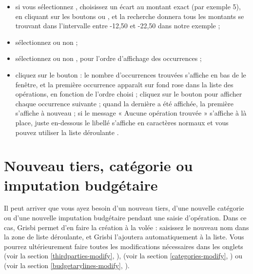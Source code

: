 \begin{enumerate}
\begin{itemize}
		\item si vous sélectionnez , choisissez un écart au montant exact (par exemple 5), en cliquant sur les boutons \menu{+} ou \menu{-}, et la recherche donnera tous les montants se trouvant dans l’intervalle entre -12,50 et -22,50 dans notre exemple ;
		\item sélectionnez ou non  ;
		\item sélectionnez ou non , pour l'ordre d'affichage des occurrences ; 
		\item cliquez sur le bouton  : le nombre d'occurrences trouvées s'affiche en bas de le fenêtre, et la première occurrence apparaît sur fond rose{\couleur} dans la liste des opérations, en fonction de l'ordre choisi ; cliquez sur le bouton  pour afficher chaque occurrence suivante ; quand la dernière a été affichée, la première s'affiche à nouveau ;	si le message « Aucune opération trouvée » s'affiche à là place, juste en-dessous le libellé  s'affiche en caractères normaux et vous pouvez utiliser la liste déroulante .	
	\end{itemize}	
\end{enumerate}




\section{Nouveau tiers, catégorie ou imputation budgétaire\label{transactions-fillcombo}}


Il peut arriver que vous ayez besoin d'un nouveau tiers, d'une nouvelle catégorie ou d'une nouvelle imputation budgétaire pendant une saisie d'opération. Dans ce cas, Grisbi permet d'en faire la création \og à la volée \fg{} : saisissez le nouveau nom dans la zone de liste déroulante, et Grisbi l'ajoutera automatiquement à la liste. Vous pourrez ultérieurement faire toutes les modifications nécessaires dans les onglets  (voir la section \vref{thirdparties-modify}, ),  (voir la section \vref{categories-modify}, ) ou  (voir la section \vref{budgetarylines-modify}, ).
 
